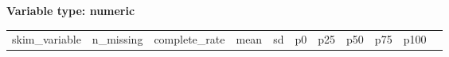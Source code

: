 \documentclass[
]{article}
\newcounter{none} %
\begin{document}
\textbf{Variable type: numeric}

{\def\LTcaptype{none} %
\begin{longtable}[]{@{}
  >{\raggedright\arraybackslash}p{}
  >{\raggedleft\arraybackslash}p{}
  >{\raggedleft\arraybackslash}p{}
  >{\raggedleft\arraybackslash}p{}
  >{\raggedleft\arraybackslash}p{}
  >{\raggedleft\arraybackslash}p{}
  >{\raggedleft\arraybackslash}p{}
  >{\raggedleft\arraybackslash}p{}
  >{\raggedleft\arraybackslash}p{}
  >{\raggedleft\arraybackslash}p{}
  >{\raggedright\arraybackslash}p{}@{}}
\toprule\noalign{}
\begin{minipage}[b]{\linewidth}\raggedright
skim\_variable
\end{minipage} & \begin{minipage}[b]{\linewidth}\raggedleft
n\_missing
\end{minipage} & \begin{minipage}[b]{\linewidth}\raggedleft
complete\_rate
\end{minipage} & \begin{minipage}[b]{\linewidth}\raggedleft
mean
\end{minipage} & \begin{minipage}[b]{\linewidth}\raggedleft
sd
\end{minipage} & \begin{minipage}[b]{\linewidth}\raggedleft
p0
\end{minipage} & \begin{minipage}[b]{\linewidth}\raggedleft
p25
\end{minipage} & \begin{minipage}[b]{\linewidth}\raggedleft
p50
\end{minipage} & \begin{minipage}[b]{\linewidth}\raggedleft
p75
\end{minipage} & \begin{minipage}[b]{\linewidth}\raggedleft
p100
\end{minipage} & \begin{minipage}[b]{\linewidth}\raggedright

\end{minipage}
\end{longtable}}
\end{document}

